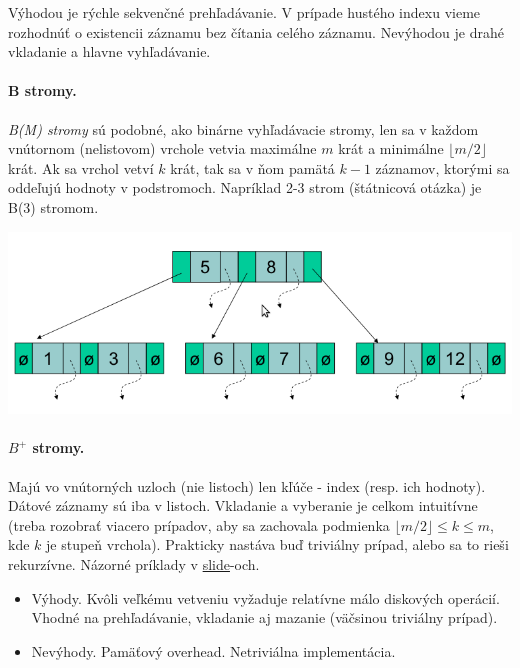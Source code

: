 \documentclass[10pt,a4paper]{article}
\begin{document}
Výhodou je rýchle sekvenčné prehľadávanie. V prípade hustého indexu vieme rozhodnúť o existencii záznamu bez čítania celého záznamu.
Nevýhodou je drahé vkladanie a hlavne vyhľadávanie.

\paragraph{B stromy.}
\emph{B(M) stromy} sú podobné, ako binárne vyhľadávacie stromy, len sa v každom vnútornom (nelistovom) vrchole vetvia maximálne $m$ krát a minimálne $\lfloor m/2 \rfloor$ krát. Ak sa vrchol vetví $k$ krát, tak sa v ňom pamätá $k-1$ záznamov, ktorými sa oddeľujú hodnoty v podstromoch. Napríklad 2-3 strom (štátnicová otázka) je B(3) stromom.

\begin{center}
\includegraphics[scale=0.5]{db_bm_tree.png}
\end{center}

\paragraph{$B^+$ stromy.}
Majú vo vnútorných uzloch (nie listoch) len kľúče - index (resp. ich hodnoty). Dátové záznamy sú iba v listoch.
Vkladanie a vyberanie je celkom intuitívne (treba rozobrať viacero prípadov, aby sa zachovala podmienka $\lfloor m/2 \rfloor \leq k \leq m$, kde $k$ je stupeň vrchola). Prakticky nastáva buď triviálny prípad, alebo sa to rieši rekurzívne. Názorné príklady v \href{http://www.dcs.fmph.uniba.sk/~plachetk/TEACHING/DB2011/db2011_10.pdf}{slide}-och.

\begin{itemize}
\item Výhody. Kvôli veľkému vetveniu vyžaduje relatívne málo diskových
      operácií. Vhodné na prehľadávanie, vkladanie aj mazanie (väčsinou triviálny prípad).
\item Nevýhody. Pamäťový overhead. Netriviálna implementácia.
\end{itemize}
\end{document}
